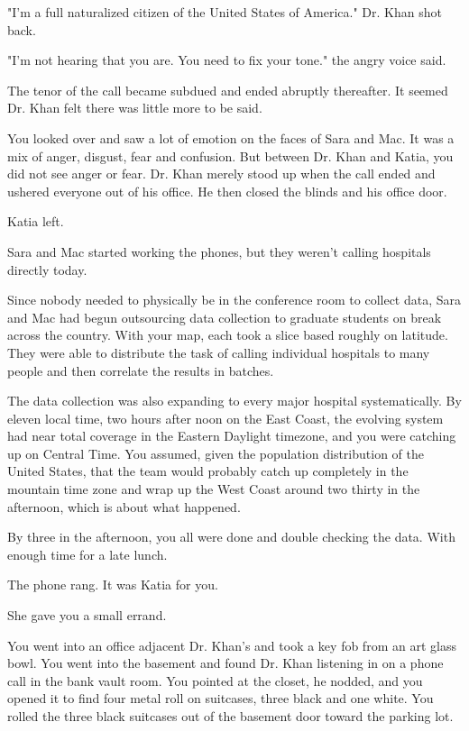 \documentclass[a5paper, symmetric]{tufte-book}
\begin{document}
"I'm a full naturalized citizen of the United States of America." Dr. Khan shot back. 

"I'm not hearing that you are. You need to fix your tone." the angry voice said. 

The tenor of the call became subdued and ended abruptly thereafter. It seemed Dr. Khan felt there was little more to be said.

You looked over and saw a lot of emotion on the faces of Sara and Mac. It was a mix of anger, disgust, fear and confusion. But between Dr. Khan and Katia, you did not see anger or fear. Dr. Khan merely stood up when the call ended and ushered everyone out of his office. He then closed the blinds and his office door. 

Katia left. 

Sara and Mac started working the phones, but they weren't calling hospitals directly today. 

Since nobody needed to physically be in the conference room to collect data, Sara and Mac had begun outsourcing data collection to graduate students on break across the country. With your map, each took a slice based roughly on latitude. They were able to distribute the task of calling individual hospitals to many people and then correlate the results in batches.

The data collection was also expanding to every major hospital systematically. By eleven local time, two hours after noon on the East Coast, the evolving system had near total coverage in the Eastern Daylight timezone, and you were catching up on Central Time. You assumed, given the population distribution of the United States, that the team would probably catch up completely in the mountain time zone and wrap up the West Coast around two thirty in the afternoon, which is about what happened. 

By three in the afternoon, you all were done and double checking the data. With enough time for a late lunch.

The phone rang. It was Katia for you. 

She gave you a small errand. 

You went into an office adjacent Dr. Khan's and took a key fob from an art glass bowl. You went into the basement and found Dr. Khan listening in on a phone call in the bank vault room. You pointed at the closet, he nodded, and you opened it to find four metal roll on suitcases, three black and one white. You rolled the three black suitcases out of the basement door toward the parking lot. 
\end{document}
